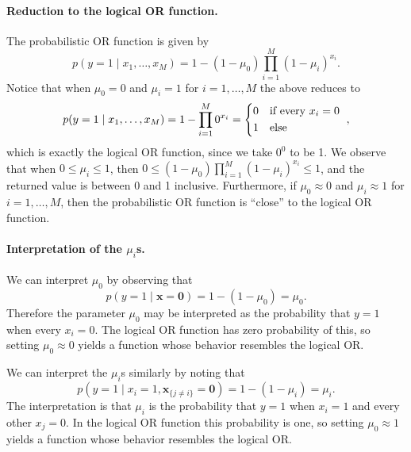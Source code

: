 \documentclass[12pt, a4paper]{article}
\newcommand{\vect}[1]{\bm{#1}}
\begin{document}
\paragraph{Reduction to the logical OR function.}
The probabilistic OR function is given by
\begin{equation*}
	p(y=1 \mid x_1, \ldots, x_M) = 1 - (1 - \mu_0) \prod_{i=1}^{M} \left(1 - \mu_i\right)^{x_i}.
\end{equation*}
Notice that when $\mu_0 = 0$ and $\mu_i = 1$ for $i=1, \ldots, M$ the above reduces to
\begin{equation*}
p(y=1 \mid x_1, \ldots, x_M) = 1 -  \prod_{i=1}^{M} 0^{x_i}
= \begin{dcases*}
0 & if every $x_i = 0$ \\
1 & else
\end{dcases*},
\end{equation*}
which is exactly the logical OR function, since we take $0^0$ to be 1.
We observe that when $0 \leq \mu_i \leq 1$, then $0 \leq (1 - \mu_0) \prod_{i=1}^{M} \left(1 - \mu_i\right)^{x_i} \leq 1$, and the returned value is between 0 and 1 inclusive.
Furthermore, if $\mu_0 \approx 0$ and $\mu_i \approx 1$ for $i=1, \ldots, M$, then the probabilistic OR function is ``close'' to the logical OR function.

\paragraph{Interpretation of the $\mu_i$s.}
We can interpret $\mu_0$ by observing that
\begin{equation*}
	p(y=1 \mid \vect{x} = \vect{0})
	=
	1 - (1 - \mu_0) = \mu_0.
\end{equation*}
Therefore the parameter $\mu_0$ may be interpreted as the probability that $y=1$ when every $x_i = 0$.
The logical OR function has zero probability of this, so setting $\mu_0 \approx 0$ yields a function whose behavior resembles the logical OR.

We can interpret the $\mu_i$s similarly by noting that
\begin{equation*}
p(y=1 \mid x_i = 1, \vect{x}_{ \{j \neq i\} }= \vect{0})
=
1 - (1 - \mu_i) = \mu_i.
\end{equation*}
The interpretation is that $\mu_i$ is the probability that $y=1$ when $x_i = 1$ and every other $x_j = 0$.
In the logical OR function this probability is one, so setting $\mu_0 \approx 1$ yields a function whose behavior resembles the logical OR.
\end{document}
